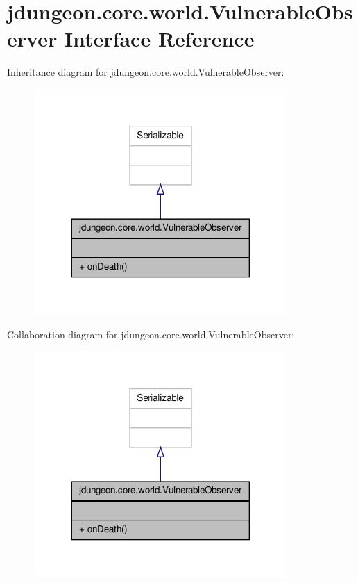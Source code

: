 \hypertarget{interfacejdungeon_1_1core_1_1world_1_1_vulnerable_observer}{
\section{jdungeon.core.world.VulnerableObserver Interface Reference}
\label{interfacejdungeon_1_1core_1_1world_1_1_vulnerable_observer}
}


Inheritance diagram for jdungeon.core.world.VulnerableObserver:
\nopagebreak
\begin{figure}[H]
\begin{center}
\leavevmode
\includegraphics[width=272pt]{interfacejdungeon_1_1core_1_1world_1_1_vulnerable_observer__inherit__graph}
\end{center}
\end{figure}


Collaboration diagram for jdungeon.core.world.VulnerableObserver:
\nopagebreak
\begin{figure}[H]
\begin{center}
\leavevmode
\includegraphics[width=272pt]{interfacejdungeon_1_1core_1_1world_1_1_vulnerable_observer__coll__graph}
\end{center}
\end{figure}
